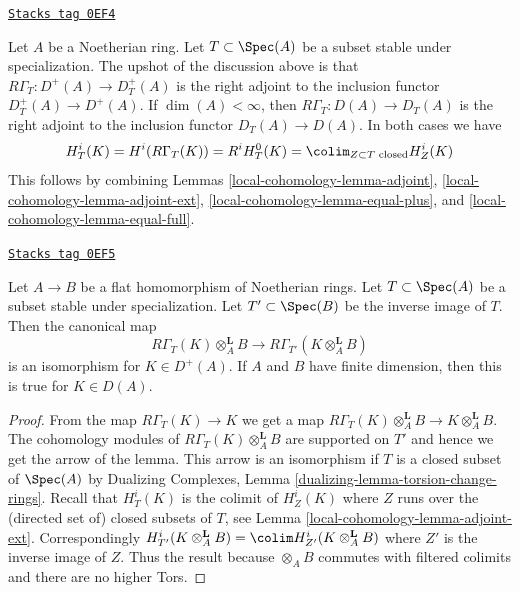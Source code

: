 \begin{remark}[Upshot]
\label{local-cohomology-remark-upshot}
\href{https://stacks.math.columbia.edu/tag/0EF4}{\texttt{Stacks tag 0EF4}}

Let $A$ be a Noetherian ring. Let $T \subset \Spec(A)$ be a
subset stable under specialization.
The upshot of the discussion above is that
$R\Gamma_T : D^+(A) \to D_T^+(A)$ is the right adjoint
to the inclusion functor $D_T^+(A) \to D^+(A)$.
If $\dim(A) < \infty$, then
$R\Gamma_T : D(A) \to D_T(A)$ is the right adjoint
to the inclusion functor $D_T(A) \to D(A)$.
In both cases we have
$$
H^i_T(K) = H^i(R\Gamma_T(K)) = R^iH^0_T(K) =
\colim_{Z \subset T\text{ closed}} H^i_Z(K)
$$
This follows by combining
Lemmas \ref{local-cohomology-lemma-adjoint}, \ref{local-cohomology-lemma-adjoint-ext},
\ref{local-cohomology-lemma-equal-plus}, and \ref{local-cohomology-lemma-equal-full}.
\end{remark}

\begin{lemma}
\label{local-cohomology-lemma-torsion-change-rings}
\href{https://stacks.math.columbia.edu/tag/0EF5}{\texttt{Stacks tag 0EF5}}

Let $A \to B$ be a flat homomorphism of Noetherian rings.
Let $T \subset \Spec(A)$ be a subset stable under specialization.
Let $T' \subset \Spec(B)$ be the inverse image of $T$.
Then the canonical map
$$
R\Gamma_T(K) \otimes_A^\mathbf{L} B
\longrightarrow
R\Gamma_{T'}(K \otimes_A^\mathbf{L} B)
$$
is an isomorphism for $K \in D^+(A)$. If $A$ and $B$ have finite
dimension, then this is true for $K \in D(A)$.
\end{lemma}

\begin{proof}
From the map $R\Gamma_T(K) \to K$ we get a map
$R\Gamma_T(K) \otimes_A^\mathbf{L} B \to K \otimes_A^\mathbf{L} B$.
The cohomology modules of $R\Gamma_T(K) \otimes_A^\mathbf{L} B$
are supported on $T'$ and hence we get the arrow of the lemma.
This arrow is an isomorphism if $T$ is a closed subset of $\Spec(A)$ by
Dualizing Complexes, Lemma \ref{dualizing-lemma-torsion-change-rings}.
Recall that $H^i_T(K)$ is the colimit of $H^i_Z(K)$ where $Z$ runs over
the (directed set of) closed subsets of $T$, see
Lemma \ref{local-cohomology-lemma-adjoint-ext}.
Correspondingly
$H^i_{T'}(K \otimes_A^\mathbf{L} B) =
\colim H^i_{Z'}(K \otimes_A^\mathbf{L} B)$ where $Z'$ is the inverse
image of $Z$. Thus the result because $\otimes_A B$ commutes
with filtered colimits and there are no higher Tors.
\end{proof}

